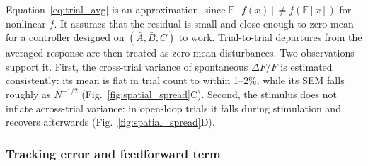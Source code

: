 Equation~\eqref{eq:trial_avg} is an approximation, since $\mathbb{E}[f(x)] \neq f(\mathbb{E}[x])$ for nonlinear $f$.
It assumes that the residual is small and close enough to zero mean for a controller designed on $(\bar A, \bar B, C)$ to work.
Trial-to-trial departures from the averaged response are then treated as zero-mean disturbances.
Two observations support it.
First, the cross-trial variance of spontaneous $\Delta F/F$ is estimated consistently: its mean is flat in trial count to within 1--2\%, while its SEM falls roughly as $N^{-1/2}$ (Fig.~\ref{fig:spatial_spread}C).
Second, the stimulus does not inflate across-trial variance: in open-loop trials it falls during stimulation and recovers afterwards (Fig.~\ref{fig:spatial_spread}D).

\subsubsection*{Tracking error and feedforward term}

